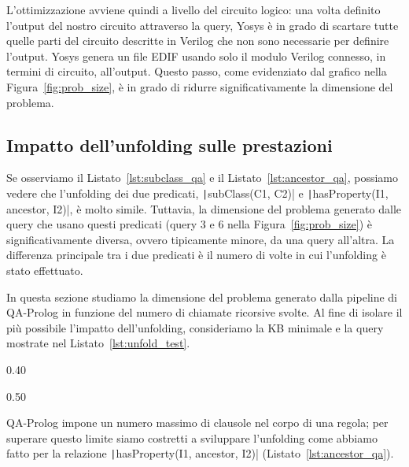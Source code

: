 L'ottimizzazione avviene quindi a livello del circuito logico: una volta definito l'output del nostro circuito attraverso la query, Yosys è in grado di scartare tutte quelle parti del circuito descritte in Verilog che non sono necessarie per definire l'output. Yosys genera un file EDIF usando solo il modulo Verilog connesso, in termini di circuito, all'output. Questo passo, come evidenziato dal grafico nella Figura~\ref{fig:prob_size}, è in grado di ridurre significativamente la dimensione del problema.

\subsection{Impatto dell'unfolding sulle prestazioni}
\label{sec:unfold_performance}
Se osserviamo il Listato~\ref{lst:subclass_qa} e il Listato~\ref{lst:ancestor_qa}, possiamo vedere che l'unfolding dei due predicati, \texttt|subClass(C1, C2)| e \texttt|hasProperty(I1, ancestor, I2)|, è molto simile. Tuttavia, la dimensione del problema generato dalle query che usano questi predicati (query $3$ e $6$ nella Figura~\ref{fig:prob_size}) è significativamente diversa, ovvero tipicamente minore, da una query all'altra. La differenza principale tra i due predicati è il numero di volte in cui l'unfolding è stato effettuato.

In questa sezione studiamo la dimensione del problema generato dalla pipeline di QA-Prolog in funzione del numero di chiamate ricorsive svolte. Al fine di isolare il più possibile l'impatto dell'unfolding, consideriamo la KB minimale e la query mostrate nel Listato~\ref{lst:unfold_test}.

\begin{listingenv}[h]
	\centering
	\begin{sublisting}[c]{0.40\linewidth}
		\caption{File Prolog (KB)}
	\end{sublisting}
	\qquad
	\begin{sublisting}[c]{0.50\linewidth}
		\caption{Query}
	\end{sublisting}
	\caption{Input unfolding}
	\label{lst:unfold_test}
\end{listingenv}

QA-Prolog impone un numero massimo di clausole nel corpo di una regola; per superare questo limite siamo costretti a sviluppare l'unfolding come abbiamo fatto per la relazione \texttt|hasProperty(I1, ancestor, I2)| (Listato~\ref{lst:ancestor_qa}).

